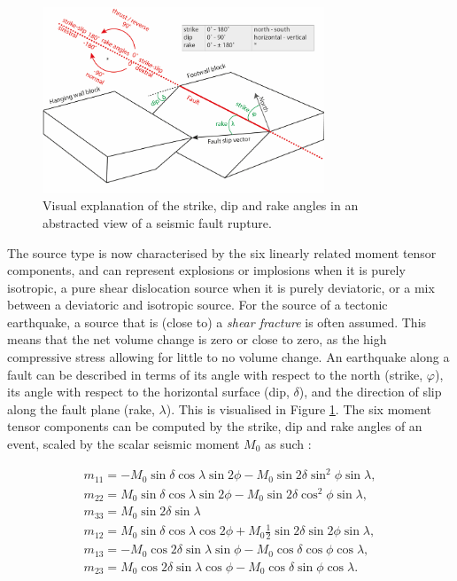 \documentclass[../Text/00main.tex]{subfiles}
\begin{document}
\begin{figure}[htb!]
    \centering
    \includegraphics[width=0.75\textwidth]{images_methods/sdr_explainfig.png}
    \caption{Visual explanation of the strike, dip and rake angles in an abstracted view of a seismic fault rupture.}
    \label{fig:sdr_explainfig}
\end{figure}

The source type is now characterised by the six linearly related moment tensor components, and can represent explosions or implosions when it is purely isotropic, a pure shear dislocation source when it is purely deviatoric, or a mix between a deviatoric and isotropic source. For the source of a tectonic earthquake, a source that is (close to) a \textit{shear fracture} is often assumed. This means that the net volume change is zero or close to zero, as the high compressive stress allowing for little to no volume change. An earthquake along a fault can be described in terms of its angle with respect to the north (strike, $\varphi$), its angle with respect to the horizontal surface (dip, $\delta$), and the direction of slip along the fault plane (rake, $\lambda$). This is visualised in Figure \ref{fig:sdr_explainfig}. The six moment tensor components can be computed by the strike, dip and rake angles of an event, scaled by the scalar seismic moment $M_0$ as such \citep{udias2014source}:

\begin{equation}
\begin{array}{l}
m_{11}=- M_0 \sin \delta \cos \lambda \sin 2 \phi- M_0 \sin 2 \delta \sin ^{2} \phi \sin \lambda, \\
m_{22}= M_0 \sin \delta \cos \lambda \sin 2 \phi- M_0 \sin 2 \delta \cos ^{2} \phi \sin \lambda, \\
m_{33}= M_0 \sin 2 \delta \sin \lambda \\
m_{12}= M_0 \sin \delta \cos \lambda \cos 2 \phi+ M_0 \frac{1}{2} \sin 2 \delta \sin 2 \phi \sin \lambda, \\
m_{13}=- M_0 \cos 2 \delta \sin \lambda \sin \phi- M_0 \cos \delta \cos \phi \cos \lambda, \\
m_{23}= M_0 \cos 2 \delta \sin \lambda \cos \phi- M_0 \cos \delta \sin \phi \cos \lambda.
\end{array}
\end{equation}
\end{document}
